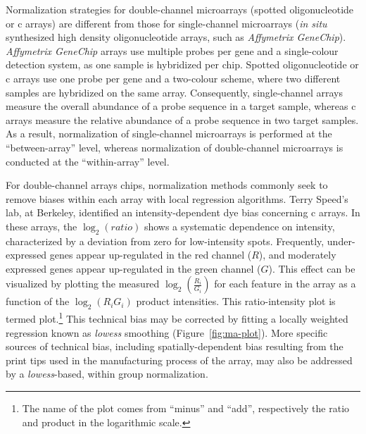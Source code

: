 Normalization strategies for double-channel microarrays (spotted oligonucleotide
or c arrays\cite{schena_quantitative_1995}) are different from
those for single-channel microarrays (\emph{in situ} synthesized high density
oligonucleotide arrays,\cite{lockhart_expression_1996} such as \emph{Affymetrix
  GeneChip}).  \emph{Affymetrix GeneChip} arrays use multiple probes per gene
and a single-colour detection system, as one sample is hybridized per chip.
Spotted oligonucleotide or c arrays use one probe per gene and a
two-colour scheme, where two different samples are hybridized on the same array.
Consequently, single-channel arrays measure the overall abundance of a probe
sequence in a target sample, whereas c arrays measure the
relative abundance of a probe sequence in two target samples.
As a result, normalization of single-channel microarrays is performed at the
``between-array'' level, whereas normalization of double-channel microarrays is
conducted at the ``within-array'' level.\cite{do_normalization_2006}

For double-channel arrays chips, normalization methods commonly seek to remove
biases within each array with local regression algorithms.  Terry Speed's lab,
at Berkeley, identified an intensity-dependent dye bias concerning
c arrays.  In these arrays, the $\log_2(ratio)$ shows a
systematic dependence on intensity, characterized by a deviation from zero for
low-intensity spots.  Frequently, under-expressed genes appear up-regulated in
the red channel ($R$), and moderately expressed genes appear up-regulated in the
green channel ($G$).
This effect can be visualized by plotting the measured
$\log_2(\frac{R_{i}}{G_{i}})$ for each feature in the array as a function of the
$\log_2(R_{i}G_{i})$ product intensities.  This ratio-intensity plot is termed
 plot.\footnote[][-4.5cm]{The name of the plot comes from
  ``minus'' and ``add'', respectively the ratio and product in the logarithmic
  scale.}  This technical bias may be corrected by fitting a locally weighted
regression known as \emph{lowess} smoothing
(Figure~\ref{fig:ma-plot}).\cite[-4.2cm]{yang_normalization_2001} More specific
sources of technical bias, including spatially-dependent bias resulting from the
print tips used in the manufacturing process of the array, may also be addressed
by a \emph{lowess}-based, within group normalization.

